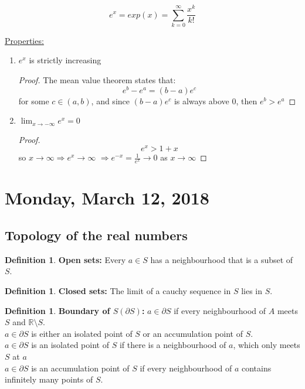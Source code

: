\documentclass[12pt]{article}
\theoremstyle{plain}
\theoremstyle{definition}
\newtheorem{definition}[theorem]{Definition}
\begin{document}
$$e^x = exp(x) = \sum^\infty_{k=0} \frac{x^k}{k!}$$

\underline{Properties:}
\begin{enumerate}
	\item{
	$e^x$ is strictly increasing
	\begin{proof}
		The mean value theorem states that:
		$$e^b - e^a = (b-a) e^c$$
		for some $c\in (a,b)$, and since $ (b-a) e^c$ is always above 0, then $e^b > e^a$
	\end{proof}

	}
	\item{$\lim_{x\to-\infty} e^x = 0$
	\begin{proof}
		$$e^x > 1+x$$
		so $x\to\infty \Longrightarrow e^x\to\infty$
		$\Longrightarrow e^{-x} = \frac{1}{e^x} \to 0$ as $x\to\infty$
	\end{proof}

	}
\end{enumerate}

\newpage

\section{Monday, March 12, 2018}

\subsection{Topology of the real numbers}

\begin{definition}
	\textbf{Open sets:} Every $a\in S$ has a neighbourhood that is a subset of $S$.
\end{definition}

\begin{definition}
	\textbf{Closed sets:} The limit of a cauchy sequence in $S$ lies in $S$.
\end{definition}

\begin{definition}
	\textbf{Boundary of $S (\partial S)$:} $a\in \partial S$ if every neighbourhood of $A$ meets $S$ and $\mathbb{R}\setminus S$.\\
	$a\in \partial S$ is either an isolated point of $S$ or an accumulation point of $S$.\\
	$a\in \partial S$ is an isolated point of $S$ if there is a neighbourhood of $a$, which only meets $S$ at $a$\\
	$a\in \partial S$ is an accumulation point of $S$ if every neighbourhood of $a$ contains infinitely many points of $S$.
\end{definition}
\end{document}
